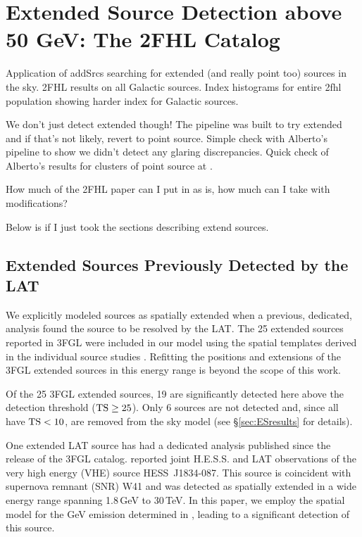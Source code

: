 \chapter{Extended Source Detection above 50 GeV: The 2FHL Catalog}
\label{chap:2FHL}

Application of addSrcs searching for extended (and really point too) sources in the sky. 2FHL results on all Galactic sources. Index histograms for entire \gls{2fhl} population showing harder index for Galactic sources.

We don't just detect extended though! The pipeline was built to try extended and if that's not likely, revert to point source. Simple check with Alberto's pipeline to show we didn't detect any glaring discrepancies. Quick check of Alberto's results for clusters of point source at \blat.

How much of the 2FHL paper can I put in as is, how much can I take with modifications?

Below is if I just took the sections describing extend sources. 

\section{\label{sec:3FGL_ES}Extended Sources Previously Detected by the LAT}
We explicitly modeled sources as spatially extended when a previous, dedicated, analysis found the source to be resolved by the LAT.
The 25 extended sources reported in 3FGL were included in our model using the spatial templates derived in the individual source studies \citep[see references in ][]{3FGL}. Refitting the positions and extensions of the 3FGL extended sources in this energy range is beyond the scope of this work.

Of the 25 3FGL extended sources, 19 are significantly detected here above the detection threshold (${\rm TS}\geq25$). Only 6 sources are not detected and, since all have  ${\rm TS<10}$, are removed from the sky model (see \S\ref{sec:ESresults} for details).

One extended LAT source has had a dedicated analysis published since the release of the 3FGL catalog. \cite{HESSLATW41} reported joint H.E.S.S. and LAT observations of the very high energy (VHE) source HESS~J1834-087. This source is coincident with supernova remnant (SNR) W41 and was detected  as spatially extended in a wide energy range spanning 1.8\,GeV to 30\,TeV. In this paper, we employ the spatial model for the GeV emission determined in \cite{HESSLATW41}, leading to a significant detection of this source.



